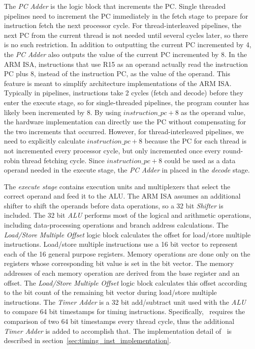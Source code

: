The \emph{PC Adder} is the logic block that increments the PC. 
Single threaded pipelines need to increment the PC immediately in the fetch stage to prepare for instruction fetch the next processor cycle.  
For thread-interleaved pipelines, the next PC from the current thread is not needed until several cycles later, so there is no such restriction.
In addition to outputting the current PC incremented by 4, the \emph{PC Adder} also outputs the value of the current PC incremented by 8.
In the ARM ISA, instructions that use R15 as an operand actually read the instruction PC plus 8, instead of the instruction PC, as the value of the operand.
This feature is meant to simplify architecture implementations of the ARM ISA.  
Typically in pipelines, instructions take 2 cycles (fetch and decode) before they enter the execute stage, so for single-threaded pipelines, the program counter has likely been incremented by 8.
By using $instruction\_pc+8$ as the operand value, the hardware implementation can directly use the PC without compensating for the two increments that occurred. 
However, for thread-interleaved pipelines, we need to explicitly calculate $instruction\_pc+8$ because the PC for each thread is not incremented every processor cycle, but only incremented once every round-robin thread fetching cycle.
Since $instruction\_pc+8$ could be used as a data operand needed in the execute stage, the \emph{PC Adder} in placed in the \emph{decode} stage.  

The \emph{execute stage} contains execution units and multiplexers that select the correct operand and feed it to the ALU.  
The ARM ISA assumes an additional shifter to shift the operands before data operations, so a 32 bit \emph{Shifter} is included.
The 32 bit \emph{ALU} performs most of the logical and arithmetic operations, including data-processing operations and branch address calculations.
The \emph{Load/Store Multiple Offset} logic block calculates the offset for load/store multiple instructions.
Load/store multiple instructions use a 16 bit vector to represent each of the 16 general purpose registers.
Memory operations are done only on the registers whose corresponding bit value is set in the bit vector.
The memory addresses of each memory operation are derived from the base register and an offset. 
The \emph{Load/Store Multiple Offset} logic block calculates this offset according to the bit count of the remaining bit vector during load/store multiple instructions.
The \emph{Timer Adder} is a 32 bit add/subtract unit used with the \emph{ALU} to compare 64 bit timestamps for timing instructions. 
Specifically, \delayuntil\ requires the comparison of two 64 bit timestamps every thread cycle, thus the additional \emph{Timer Adder} is added to accomplish that.  
The implementation detail of \delayuntil\ is described in section~\ref{sec:timing_inst_implementation}.

